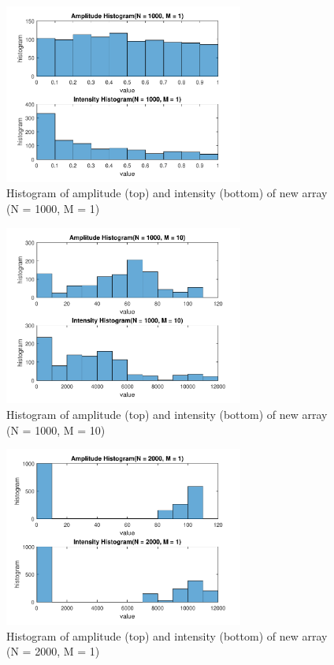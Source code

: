 \documentclass{article}
\begin{document}
\begin{figure}[H]
	\centering
	\includegraphics[width = 0.7\textwidth]{src/2pi/hist_1000_1.pdf}
	\caption{Histogram of amplitude (top) and intensity (bottom) of new array (N = 1000, M = 1)}
	\label{fig:hist-1000-1}
\end{figure}
\begin{figure}[H]
	\centering
	\includegraphics[width = 0.7\textwidth]{src/2pi/hist_1000_10.pdf}
	\caption{Histogram of amplitude (top) and intensity (bottom) of new array (N = 1000, M = 10)}
	\label{fig:hist-1000-10}
\end{figure}
\begin{figure}[H]
	\centering
	\includegraphics[width = 0.7\textwidth]{src/2pi/hist_2000_1.pdf}
	\caption{Histogram of amplitude (top) and intensity (bottom) of new array (N = 2000, M = 1)}
	\label{fig:hist-2000-1}
\end{figure}
\end{document}
